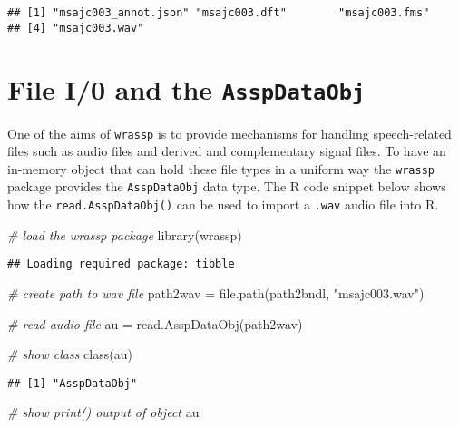 \documentclass[
]{book}
\newenvironment{Shaded}{\begin{snugshade}}{\end{snugshade}}
\newcommand{\CommentTok}[1]{\textcolor[rgb]{0.56,0.35,0.01}{\textit{#1}}}
\newcommand{\FunctionTok}[1]{\textcolor[rgb]{0.00,0.00,0.00}{#1}}
\newcommand{\NormalTok}[1]{#1}
\newcommand{\OtherTok}[1]{\textcolor[rgb]{0.56,0.35,0.01}{#1}}
\newcommand{\StringTok}[1]{\textcolor[rgb]{0.31,0.60,0.02}{#1}}
\begin{document}
\begin{verbatim}
## [1] "msajc003_annot.json" "msajc003.dft"        "msajc003.fms"       
## [4] "msajc003.wav"
\end{verbatim}

\hypertarget{file-i0-and-the-asspdataobj}{%
\section{\texorpdfstring{File I/0 and the \texttt{AsspDataObj}}{File I/0 and the AsspDataObj}}\label{file-i0-and-the-asspdataobj}}

One of the aims of \texttt{wrassp} is to provide mechanisms for handling speech-related files such as audio files and derived and complementary signal files. To have an in-memory object that can hold these file types in a uniform way the \texttt{wrassp} package provides the \texttt{AsspDataObj} data type. The R code snippet below shows how the \texttt{read.AsspDataObj()} can be used to import a \texttt{.wav} audio file into R.

\begin{Shaded}
\begin{Highlighting}[]
\CommentTok{\# load the wrassp package}
\FunctionTok{library}\NormalTok{(wrassp)}
\end{Highlighting}
\end{Shaded}

\begin{verbatim}
## Loading required package: tibble
\end{verbatim}

\begin{Shaded}
\begin{Highlighting}[]
\CommentTok{\# create path to wav file}
\NormalTok{path2wav }\OtherTok{=} \FunctionTok{file.path}\NormalTok{(path2bndl, }\StringTok{"msajc003.wav"}\NormalTok{)}

\CommentTok{\# read audio file}
\NormalTok{au }\OtherTok{=} \FunctionTok{read.AsspDataObj}\NormalTok{(path2wav)}

\CommentTok{\# show class}
\FunctionTok{class}\NormalTok{(au)}
\end{Highlighting}
\end{Shaded}

\begin{verbatim}
## [1] "AsspDataObj"
\end{verbatim}

\begin{Shaded}
\begin{Highlighting}[]
\CommentTok{\# show print() output of object}
\NormalTok{au}
\end{Highlighting}
\end{Shaded}
\end{document}
